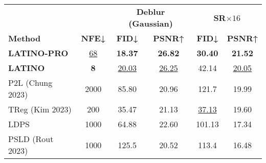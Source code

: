 \documentclass[varwidth, crop, margin=10pt]{standalone}
\begin{document}
\begin{table}[t]
\centering \footnotesize\setlength{\tabcolsep}{5pt}
\begin{tabular}{lccccc}
 \toprule
 & & \multicolumn{2}{c}{\textbf{Deblur (Gaussian)}} & \multicolumn{2}{c}{\textbf{SR$\times16$}} \\%
 \cmidrule(lr){3-4} \cmidrule(lr){5-6}
  \textbf{Method} &  \textbf{NFE↓} & \textbf{FID↓} & \textbf{PSNR↑} & \textbf{FID↓} & \textbf{PSNR↑} \\    
  \hline
\textbf{LATINO-PRO } & \underline{68} & \textbf{18.37} & \textbf{26.82}  & \textbf{30.40} &  \textbf{21.52}     \\ %
\textbf{LATINO}  & \textbf{8} & \underline{20.03} &     \underline{26.25}   & 42.14 & \underline{20.05}   \\ \hline
P2L (Chung 2023)   &     2000     & 85.80 & 20.96   & 121.7 & 19.99      \\ %
TReg (Kim 2023)   &     200     & 35.47 & 21.13   &   \underline{37.13}  &     19.60   \\%
LDPS   &     1000     & 64.88 & 22.60  & 101.13 & 17.34        \\ %
PSLD (Rout 2023)    &  1000  &    125.5     & 20.52   &    113.4   &  16.48 \\ %
\bottomrule
\end{tabular}
\end{table}
\end{document}
